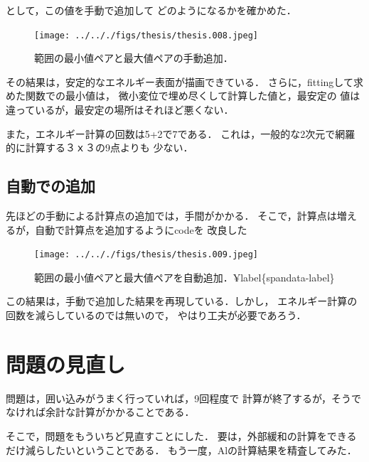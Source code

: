 として，この値を手動で追加して どのようになるかを確かめた．

\begin{figure}[H]
\centering
\begin{center}
\texttt{[image: ../.././figs/thesis/thesis.008.jpeg]}
\end{center}
\caption{範囲の最小値ペアと最大値ペアの手動追加．\label{spandata-label}}

\label{fig:}
\end{figure}

その結果は，安定的なエネルギー表面が描画できている．
さらに，fittingして求めた関数での最小値は，
微小変位で埋め尽くして計算した値と，最安定の
値は違っているが，最安定の場所はそれほど悪くない．

また，エネルギー計算の回数は5+2で7である．
これは，一般的な2次元で網羅的に計算する３ｘ３の9点よりも 少ない．

    \subsection{自動での追加}\label{ux81eaux52d5ux3067ux306eux8ffdux52a0}

先ほどの手動による計算点の追加では，手間がかかる．
そこで，計算点は増えるが，自動で計算点を追加するようにcodeを 改良した

\begin{figure}[H]
\centering
\begin{center}
\texttt{[image: ../.././figs/thesis/thesis.009.jpeg]}
\end{center}
\caption{範囲の最小値ペアと最大値ペアを自動追加．¥label\{spandata-label\}}

\label{fig:}
\end{figure}

この結果は，手動で追加した結果を再現している．しかし，
エネルギー計算の回数を減らしているのでは無いので，
やはり工夫が必要であろう．

    \section{問題の見直し}\label{ux554fux984cux306eux898bux76f4ux3057}

問題は，囲い込みがうまく行っていれば，9回程度で
計算が終了するが，そうでなければ余計な計算がかかることである．

そこで，問題をもういちど見直すことにした．
要は，外部緩和の計算をできるだけ減らしたいということである．
もう一度，Alの計算結果を精査してみた．


